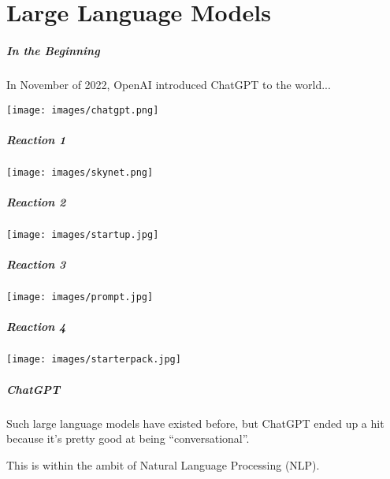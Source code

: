 \part{Large Language Models}

\begin{frame}
\partpage
\end{frame}

\begin{frame}
\frametitle{In the Beginning}

In November of 2022, OpenAI introduced ChatGPT to the world...

\begin{center}
	\texttt{[image: images/chatgpt.png]}
\end{center}

\end{frame}

\begin{frame}
\frametitle{Reaction 1}

\begin{center}
	\texttt{[image: images/skynet.png]}
\end{center}

\end{frame}

\begin{frame}
\frametitle{Reaction 2}

\begin{center}
	\texttt{[image: images/startup.jpg]}
\end{center}

\end{frame}

\begin{frame}
\frametitle{Reaction 3}

\begin{center}
	\texttt{[image: images/prompt.jpg]}
\end{center}

\end{frame}

\begin{frame}
\frametitle{Reaction 4}

\begin{center}
	\texttt{[image: images/starterpack.jpg]}
\end{center}

\end{frame}


\begin{frame}
\frametitle{ChatGPT}

Such large language models have existed before, but ChatGPT ended up a hit because it's pretty good at being ``conversational''.

This is within the ambit of Natural Language Processing (NLP).

\end{frame}

